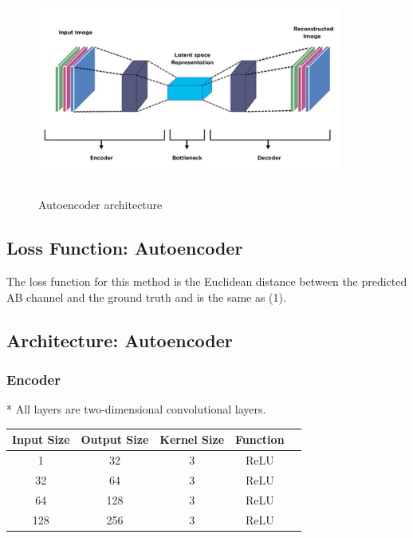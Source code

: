 \documentclass{article}
\begin{document}
\begin{figure}
    \includegraphics[width=10cm, height=7cm]{autoencoder.jpg}
    \caption{Autoencoder architecture}
\end{figure}

\subsection{Loss Function: Autoencoder}
The loss function for this method is the Euclidean distance between the predicted AB channel and the ground truth and is the same as (1).



\subsection{Architecture: Autoencoder}


\subsubsection{Encoder}
* All layers are two-dimensional convolutional layers.

\begin{center}
\begin{tabular}{ |c|c|c|c|c| } 
\hline
Input Size & Output Size & Kernel Size & Function  \\
\hline
1 & 32 & 3 & ReLU \\ 
32 & 64 & 3 & ReLU  \\ 
64 & 128 & 3 & ReLU \\ 
128 & 256 & 3 & ReLU \\ 

\hline
\end{tabular}
\end{center}
\end{document}
